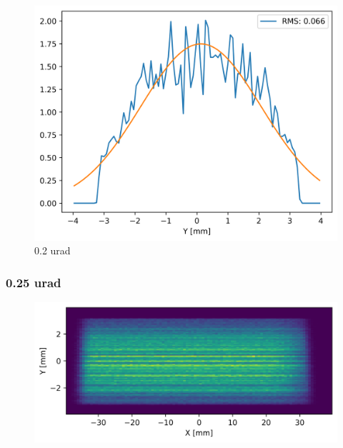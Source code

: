 \begin{figure}[H]
\centering
\includegraphics[width=0.9\linewidth]{./../figures/slope_error/WB4C_d30_d-spacing_gradient_45keV_slope_error02urad_Yprofile.png}
\caption{0.2 urad}
\label{fig:02urad}
\end{figure}

\clearpage
\subsubsection{0.25 urad}
\begin{figure}[H]
\centering
\includegraphics[width=0.9\linewidth]{./../figures/slope_error/WB4C_d30_d-spacing_gradient_45keV_slope_error025urad.png}
\end{figure}

